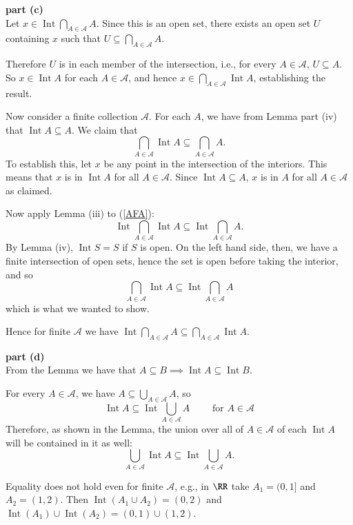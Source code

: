 \documentclass{homework}
\newcommand{\calA}{\mathcal{A}}
\DeclareMathOperator{\Int}{\mathrm{Int}}
\begin{document}
\textbf{part (c)}\\
Let $x\in\Int\displaystyle\bigcap_{A\in\calA} A$.  Since this is an
open set,
there exists an open set $U$ containing $x$ such that
$U \subseteq \displaystyle\bigcap_{A\in\calA} A$.

Therefore $U$ is in each member of the intersection, i.e., for every
$A\in\calA$, $U\subseteq A$.  So $x\in\Int A$ for each $A\in\calA$,
and hence $x\in\displaystyle\bigcap_{A\in\calA}\Int A$, establishing
the result.

Now consider a finite collection $\calA$.  For each $A$, we have from
Lemma part (iv) that $\Int A\subseteq A$.  We claim that
\begin{equation}
\bigcap_{A\in\calA} \Int A \subseteq \bigcap_{A\in\calA} A.\label{AFA}
\end{equation}
To establish this, let $x$ be any point in the intersection of the
interiors.  This means that $x$ is in $\Int A$ for all $A\in\calA$.
Since $\Int A\subseteq A$, $x$ is in $A$ for all $A\in\calA$ as
claimed.

Now apply Lemma (iii) to (\ref{AFA}):
$$\Int \bigcap_{A\in\calA} \Int A \subseteq \Int \bigcap_{A\in\calA} A.$$
By Lemma (iv), $\Int S=S$ if $S$ is open.
On the left hand side, then, we have a finite intersection of open sets, hence
the set is open before taking the interior, and so
$$ \bigcap_{A\in\calA} \Int A \subseteq \Int \bigcap_{A\in\calA} A$$
which is what we wanted to show.

Hence for finite $\calA$ we have
$\displaystyle\Int\bigcap_{A\in\calA} A \subseteq \bigcap_{A\in\calA}\Int A$.

\textbf{part (d)}\\
From the Lemma we have that
$A\subseteq B\implies\Int A\subseteq\Int B$.

For every $A\in\calA$, we have $A \subseteq \displaystyle\bigcup_{A\in\calA}A$, so
$$ \Int A \subseteq \Int \bigcup_{A\in\calA} A \qquad\text{ for }A\in\calA $$
Therefore, as shown in the Lemma, the union over all of
$A\in\calA$ of each $\Int A$ will be contained in it
as well:
$$ \bigcup_{A\in\calA} \Int A \subseteq \Int \bigcup_{A\in\calA} A. $$

Equality does not hold even for finite $\calA$, e.g., in $\RR$
take $A_1=(0,1]$ and $A_2=(1,2)$.  Then $\Int(A_1\cup A_2)=(0,2)$ and
$\Int(A_1)\cup\Int(A_2)=(0,1)\cup(1,2)$.
\end{document}
